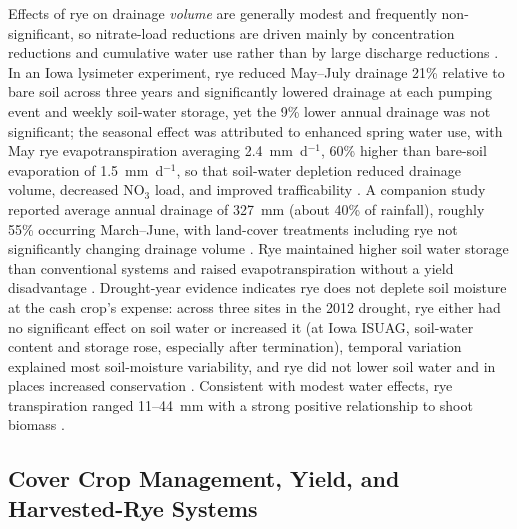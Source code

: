 Effects of rye on drainage \emph{volume} are generally modest and frequently non-significant, so nitrate-load reductions are driven mainly by concentration reductions and cumulative water use rather than by large discharge reductions \parencite{Kaspar2012,MartinezFeria2016,Waring2020,Qi2011b}. In an Iowa lysimeter experiment, rye reduced May--July drainage 21\% relative to bare soil across three years and significantly lowered drainage at each pumping event and weekly soil-water storage, yet the 9\% lower annual drainage was not significant; the seasonal effect was attributed to enhanced spring water use, with May rye evapotranspiration averaging 2.4~mm~d$^{-1}$, 60\% higher than bare-soil evaporation of 1.5~mm~d$^{-1}$, so that soil-water depletion reduced drainage volume, decreased NO$_3$ load, and improved trafficability \parencite{Qi2010b}. A companion study reported average annual drainage of 327~mm (about 40\% of rainfall), roughly 55\% occurring March--June, with land-cover treatments including rye not significantly changing drainage volume \parencite{Qi2011b}. Rye maintained higher soil water storage than conventional systems and raised evapotranspiration without a yield disadvantage \parencite{Qi2011}. Drought-year evidence indicates rye does not deplete soil moisture at the cash crop's expense: across three sites in the 2012 drought, rye either had no significant effect on soil water or increased it (at Iowa ISUAG, soil-water content and storage rose, especially after termination), temporal variation explained most soil-moisture variability, and rye did not lower soil water and in places increased conservation \parencite{Daigh2014b}. Consistent with modest water effects, rye transpiration ranged 11--44~mm with a strong positive relationship to shoot biomass \parencite{MartinezFeria2016}.

\subsection{Cover Crop Management, Yield, and Harvested-Rye Systems}

